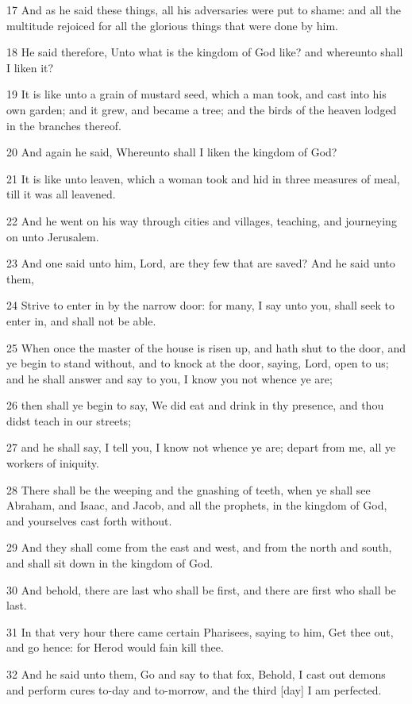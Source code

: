 \par 17 And as he said these things, all his adversaries were put to shame: and all the multitude rejoiced for all the glorious things that were done by him.
\par 18 He said therefore, Unto what is the kingdom of God like? and whereunto shall I liken it?
\par 19 It is like unto a grain of mustard seed, which a man took, and cast into his own garden; and it grew, and became a tree; and the birds of the heaven lodged in the branches thereof.
\par 20 And again he said, Whereunto shall I liken the kingdom of God?
\par 21 It is like unto leaven, which a woman took and hid in three measures of meal, till it was all leavened.
\par 22 And he went on his way through cities and villages, teaching, and journeying on unto Jerusalem.
\par 23 And one said unto him, Lord, are they few that are saved? And he said unto them,
\par 24 Strive to enter in by the narrow door: for many, I say unto you, shall seek to enter in, and shall not be able.
\par 25 When once the master of the house is risen up, and hath shut to the door, and ye begin to stand without, and to knock at the door, saying, Lord, open to us; and he shall answer and say to you, I know you not whence ye are;
\par 26 then shall ye begin to say, We did eat and drink in thy presence, and thou didst teach in our streets;
\par 27 and he shall say, I tell you, I know not whence ye are; depart from me, all ye workers of iniquity.
\par 28 There shall be the weeping and the gnashing of teeth, when ye shall see Abraham, and Isaac, and Jacob, and all the prophets, in the kingdom of God, and yourselves cast forth without.
\par 29 And they shall come from the east and west, and from the north and south, and shall sit down in the kingdom of God.
\par 30 And behold, there are last who shall be first, and there are first who shall be last.
\par 31 In that very hour there came certain Pharisees, saying to him, Get thee out, and go hence: for Herod would fain kill thee.
\par 32 And he said unto them, Go and say to that fox, Behold, I cast out demons and perform cures to-day and to-morrow, and the third [day] I am perfected.
